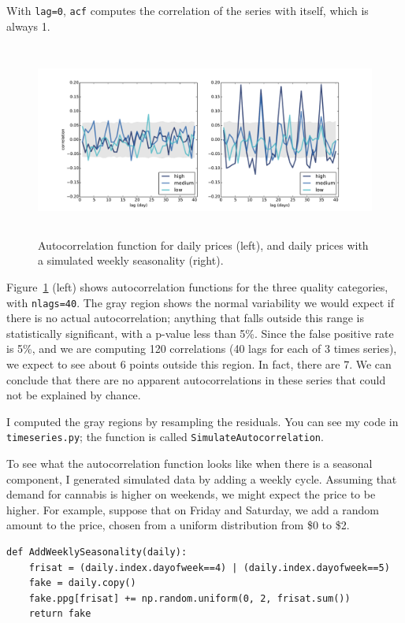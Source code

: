 \documentclass[12pt]{book}
\begin{document}
With {\tt lag=0}, {\tt acf} computes the correlation of the series
with itself, which is always 1.

\begin{figure}
\centerline{\includegraphics[height=2.5in]{figs/timeseries9.pdf}}
\caption{Autocorrelation function for daily prices (left), and
daily prices with a simulated weekly seasonality (right).}
\label{timeseries9}
\end{figure}

Figure~\ref{timeseries9} (left) shows autocorrelation functions for
the three quality categories, with {\tt nlags=40}.  The gray region
shows the normal variability we would expect if there is no actual
autocorrelation; anything that falls outside this range is
statistically significant, with a p-value less than 5\%.  Since
the false positive rate is 5\%, and
we are computing 120 correlations (40 lags for each of 3 times series),
we expect to see about 6 points outside this region.  In fact, there
are 7.  We can conclude that there are no apparent autocorrelations
in these series that could not be explained by chance.

I computed the gray regions by resampling the residuals.  You
can see my code in {\tt timeseries.py}; the function is called
{\tt SimulateAutocorrelation}.

To see what the autocorrelation function looks like when there is
a seasonal component, I generated simulated data by adding a weekly
cycle.  Assuming that demand for cannabis is higher on weekends,
we might expect the price to be higher.  For example, suppose
that on Friday and Saturday, we add a random amount to the price,
chosen from a uniform distribution from \$0 to \$2.

\begin{verbatim}
def AddWeeklySeasonality(daily):
    frisat = (daily.index.dayofweek==4) | (daily.index.dayofweek==5)
    fake = daily.copy()
    fake.ppg[frisat] += np.random.uniform(0, 2, frisat.sum())
    return fake
\end{verbatim}
\end{document}
